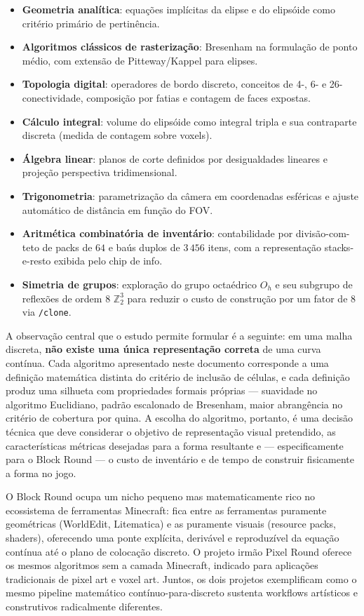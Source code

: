 \documentclass[12pt,a4paper]{scrartcl}
\newcommand{\acc}[1]{\textcolor{accent}{\textbf{#1}}}
\newcommand{\cmd}[1]{\textcolor{earth}{\texttt{\small #1}}}
\begin{document}
\begin{itemize}[leftmargin=1.3em,itemsep=0.25em,topsep=0.4em]
  \item \acc{Geometria analítica}: equações implícitas da elipse e do elipsóide como critério primário de pertinência.
  \item \acc{Algoritmos clássicos de rasterização}: Bresenham na formulação de ponto médio, com extensão de Pitteway/Kappel para elipses.
  \item \acc{Topologia digital}: operadores de bordo discreto, conceitos de 4-, 6- e 26-conectividade, composição por fatias e contagem de faces expostas.
  \item \acc{Cálculo integral}: volume do elipsóide como integral tripla e sua contraparte discreta (medida de contagem sobre voxels).
  \item \acc{Álgebra linear}: planos de corte definidos por desigualdades lineares e projeção perspectiva tridimensional.
  \item \acc{Trigonometria}: parametrização da câmera em coordenadas esféricas e ajuste automático de distância em função do FOV.
  \item \acc{Aritmética combinatória de inventário}: contabilidade por divisão-com-teto de packs de $64$ e baús duplos de $3\,456$ itens, com a representação stacks-e-resto exibida pelo chip de info.
  \item \acc{Simetria de grupos}: exploração do grupo octaédrico $O_h$ e seu subgrupo de reflexões de ordem $8$ $\mathbb{Z}_2^3$ para reduzir o custo de construção por um fator de $8$ via \cmd{/clone}.
\end{itemize}

A observação central que o estudo permite formular é a seguinte: em uma malha discreta, \acc{não existe uma única representação correta} de uma curva contínua. Cada algoritmo apresentado neste documento corresponde a uma definição matemática distinta do critério de inclusão de células, e cada definição produz uma silhueta com propriedades formais próprias --- suavidade no algoritmo Euclidiano, padrão escalonado de Bresenham, maior abrangência no critério de cobertura por quina. A escolha do algoritmo, portanto, é uma decisão técnica que deve considerar o objetivo de representação visual pretendido, as características métricas desejadas para a forma resultante e --- especificamente para o Block Round --- o custo de inventário e de tempo de construir fisicamente a forma no jogo.

O Block Round ocupa um nicho pequeno mas matematicamente rico no ecossistema de ferramentas Minecraft: fica entre as ferramentas puramente geométricas (WorldEdit, Litematica) e as puramente visuais (resource packs, shaders), oferecendo uma ponte explícita, derivável e reproduzível da equação contínua até o plano de colocação discreto. O projeto irmão Pixel Round oferece os mesmos algoritmos sem a camada Minecraft, indicado para aplicações tradicionais de pixel art e voxel art. Juntos, os dois projetos exemplificam como o mesmo pipeline matemático contínuo-para-discreto sustenta workflows artísticos e construtivos radicalmente diferentes.
\end{document}
